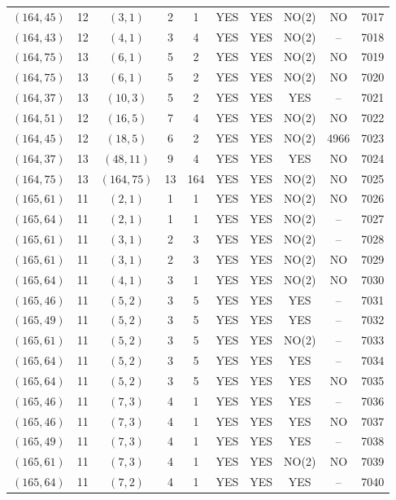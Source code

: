 \begin{longtable}{|c|c|c|c|c|c|c|c|c|c|}
$(164, 45)$ & 12 & $(3, 1)$ & 2 & 1 & YES & YES & NO(2) & NO & 7017\\
$(164, 43)$ & 12 & $(4, 1)$ & 3 & 4 & YES & YES & NO(2) & -- & 7018\\
$(164, 75)$ & 13 & $(6, 1)$ & 5 & 2 & YES & YES & NO(2) & NO & 7019\\
$(164, 75)$ & 13 & $(6, 1)$ & 5 & 2 & YES & YES & NO(2) & NO & 7020\\
$(164, 37)$ & 13 & $(10, 3)$ & 5 & 2 & YES & YES & YES & -- & 7021\\
$(164, 51)$ & 12 & $(16, 5)$ & 7 & 4 & YES & YES & NO(2) & NO & 7022\\
$(164, 45)$ & 12 & $(18, 5)$ & 6 & 2 & YES & YES & NO(2) & 4966 & 7023\\
$(164, 37)$ & 13 & $(48, 11)$ & 9 & 4 & YES & YES & YES & NO & 7024\\
$(164, 75)$ & 13 & $(164, 75)$ & 13 & 164 & YES & YES & NO(2) & NO & 7025\\
$(165, 61)$ & 11 & $(2, 1)$ & 1 & 1 & YES & YES & NO(2) & NO & 7026\\
$(165, 64)$ & 11 & $(2, 1)$ & 1 & 1 & YES & YES & NO(2) & -- & 7027\\
$(165, 61)$ & 11 & $(3, 1)$ & 2 & 3 & YES & YES & NO(2) & -- & 7028\\
$(165, 61)$ & 11 & $(3, 1)$ & 2 & 3 & YES & YES & NO(2) & NO & 7029\\
$(165, 64)$ & 11 & $(4, 1)$ & 3 & 1 & YES & YES & NO(2) & NO & 7030\\
$(165, 46)$ & 11 & $(5, 2)$ & 3 & 5 & YES & YES & YES & -- & 7031\\
$(165, 49)$ & 11 & $(5, 2)$ & 3 & 5 & YES & YES & YES & -- & 7032\\
$(165, 61)$ & 11 & $(5, 2)$ & 3 & 5 & YES & YES & NO(2) & -- & 7033\\
$(165, 64)$ & 11 & $(5, 2)$ & 3 & 5 & YES & YES & YES & -- & 7034\\
$(165, 64)$ & 11 & $(5, 2)$ & 3 & 5 & YES & YES & YES & NO & 7035\\
$(165, 46)$ & 11 & $(7, 3)$ & 4 & 1 & YES & YES & YES & -- & 7036\\
$(165, 46)$ & 11 & $(7, 3)$ & 4 & 1 & YES & YES & YES & NO & 7037\\
$(165, 49)$ & 11 & $(7, 3)$ & 4 & 1 & YES & YES & YES & -- & 7038\\
$(165, 61)$ & 11 & $(7, 3)$ & 4 & 1 & YES & YES & NO(2) & NO & 7039\\
$(165, 64)$ & 11 & $(7, 2)$ & 4 & 1 & YES & YES & YES & -- & 7040\\

\end{longtable}
